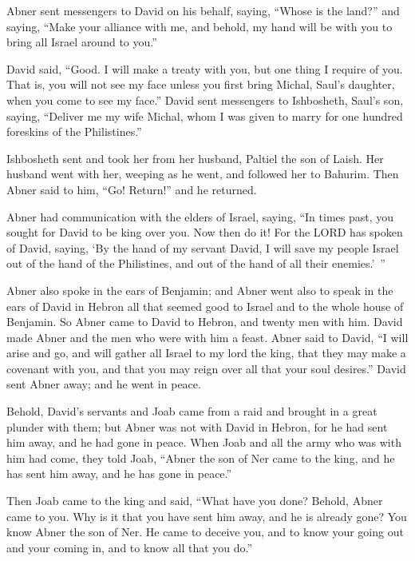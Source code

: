 \myverse{}Abner sent messengers to David on his behalf, saying, “Whose
is the land?” and saying, “Make your alliance with me, and behold, my hand will be with you to bring all
Israel around to you.”

\myverse{}David said, “Good. I will make a treaty with you, but one thing
I require of you. That is, you will not see my face unless you first bring Michal, Saul’s daughter, when
you come to see my face.”
\myverse{}David sent messengers to Ishbosheth, Saul’s son, saying, “Deliver me my wife
Michal, whom I was given to marry for one hundred foreskins of the Philistines.”

\myverse{}Ishbosheth sent and took her from her husband, Paltiel the son
of Laish.
\myverse{}Her husband went with her, weeping as he went, and followed her to Bahurim.
Then Abner said to him, “Go! Return!” and he returned.

\myverse{}Abner had communication with the elders of Israel, saying, “In
times past, you sought for David to be king over you.
\myverse{}Now then do it! For the LORD has spoken of David, saying, ‘By the hand of
my servant David, I will save my people Israel out of the hand of the Philistines, and out of the hand
of all their enemies.’ ”

\myverse{}Abner also spoke in the ears of Benjamin; and Abner went also
to speak in the ears of David in Hebron all that seemed good to Israel and to the whole house of Benjamin.
\myverse{}So Abner came to David to Hebron, and twenty men with him. David made Abner
and the men who were with him a feast.
\myverse{}Abner said to David, “I will arise and go, and will gather all Israel to my
lord the king, that they may make a covenant with you, and that you may reign over all that your soul
desires.” David sent Abner away; and he went in peace.

\myverse{}Behold, David’s servants and Joab came from a raid and brought
in a great plunder with them; but Abner was not with David in Hebron, for he had sent him away, and he
had gone in peace.
\myverse{}When Joab and all the army who was with him had come, they told Joab, “Abner
the son of Ner came to the king, and he has sent him away, and he has gone in peace.”

\myverse{}Then Joab came to the king and said, “What have you done? Behold,
Abner came to you. Why is it that you have sent him away, and he is already gone?
\myverse{}You know Abner the son of Ner. He came to deceive you, and to know your going
out and your coming in, and to know all that you do.”

